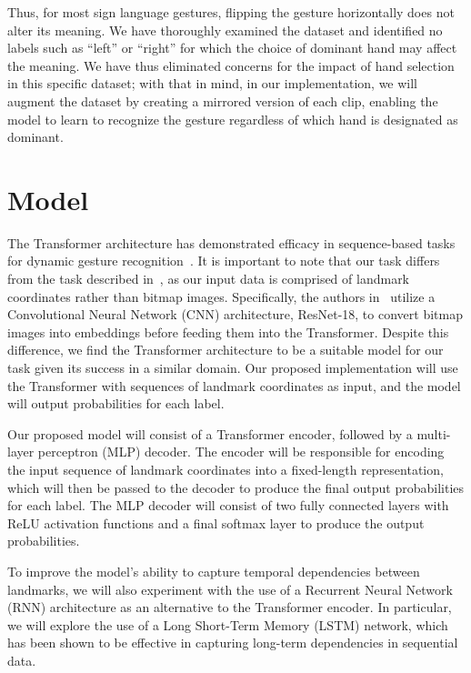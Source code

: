 \documentclass[10pt,twocolumn,letterpaper]{article}
\begin{document}
\begin{CJK*}{UTF8}{bsmi}
{Thus, for most sign language gestures, flipping the gesture horizontally does not alter its meaning. We have thoroughly examined the dataset and identified no labels such as “left” or “right” for which the choice of dominant hand may affect the meaning. We have thus eliminated concerns for the impact of hand selection in this specific dataset; with that in mind, in our implementation, we will augment the dataset by creating a mirrored version of each clip, enabling the model to learn to recognize the gesture regardless of which hand is designated as dominant.
}

\section{Model}
{\color{blue}
The Transformer architecture has demonstrated efficacy in sequence-based tasks for dynamic gesture recognition~\cite{TR}. It is important to note that our task differs from the task described in~\cite{TR}, as our input data is comprised of landmark coordinates rather than bitmap images. Specifically, the authors in~\cite{TR} utilize a Convolutional Neural Network (CNN) architecture, ResNet-18, to convert bitmap images into embeddings before feeding them into the Transformer. Despite this difference, we find the Transformer architecture to be a suitable model for our task given its success in a similar domain. Our proposed implementation will use the Transformer with sequences of landmark coordinates as input, and the model will output probabilities for each label.

Our proposed model will consist of a Transformer encoder, followed by a multi-layer perceptron (MLP) decoder. The encoder will be responsible for encoding the input sequence of landmark coordinates into a fixed-length representation, which will then be passed to the decoder to produce the final output probabilities for each label. The MLP decoder will consist of two fully connected layers with ReLU activation functions and a final softmax layer to produce the output probabilities.

To improve the model’s ability to capture temporal dependencies between landmarks, we will also experiment with the use of a Recurrent Neural Network (RNN) architecture as an alternative to the Transformer encoder. In particular, we will explore the use of a Long Short-Term Memory (LSTM) network, which has been shown to be effective in capturing long-term dependencies in sequential data.
}

\end{CJK*}
\end{document}
